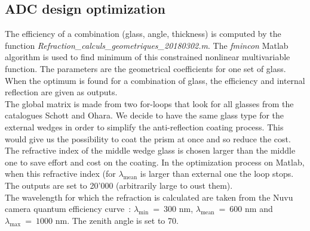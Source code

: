 \subsection{ADC design optimization}
The efficiency of a combination (glass, angle, thickness) is computed by the function \textit{Refraction\_calculs\_geometriques\_20180302.m}. The \textit{fmincon} Matlab algorithm is used to find minimum of this constrained nonlinear multivariable function. The parameters are the geometrical coefficients for one set of glass. When the optimum is found for a combination of glass, the efficiency and internal reflection are given as outputs.\\

The global matrix is made from two for-loops that look for all glasses from the catalogues Schott and Ohara. We decide to have the same glass type for the external wedges in order to simplify the anti-reflection coating process. This would give us the possibility to coat the prism at once and so reduce the cost. The refractive index of the middle wedge glass is chosen larger than the middle one to save effort and cost on the coating. In the optimization process on Matlab, when this refractive index (for $\lambda_\text{mean}$ is larger than external one the loop stops. The outputs are set to 20'000 (arbitrarily large to oust them).\\
The wavelength for which the refraction is calculated are taken from the Nuvu camera quantum efficiency curve~: $\lambda_\text{min}~=~300$ nm, $\lambda_\text{mean}~=~600$ nm and $\lambda_\text{max}~=~1000$ nm. The zenith angle is set to 70\degree.

















